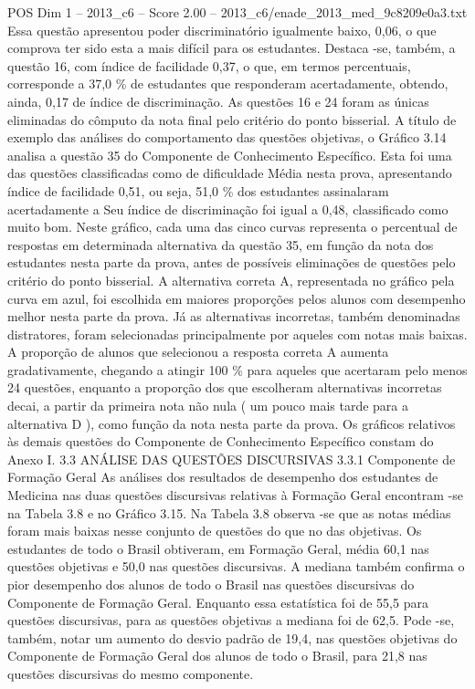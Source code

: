 \begin{textsample}{POS Dim 1 – 2013\_c6 – Score 2.00 – 2013\_c6/enade\_2013\_med\_9c8209e0a3.txt}
Essa questão apresentou poder discriminatório igualmente baixo, 0,06, o que comprova ter sido esta a mais difícil para os estudantes.
Destaca -se, também, a questão 16, com índice de facilidade 0,37, o que, em termos percentuais, corresponde a 37,0 \% de estudantes que responderam acertadamente, obtendo, ainda, 0,17 de índice de discriminação.
As questões 16 e 24 foram as únicas eliminadas do cômputo da nota final pelo critério do ponto bisserial.
A título de exemplo das análises do comportamento das questões objetivas, o Gráfico 3.14 analisa a questão 35 do Componente de Conhecimento Específico.
Esta foi uma das questões classificadas como de dificuldade Média nesta prova, apresentando índice de facilidade 0,51, ou seja, 51,0 \% dos estudantes assinalaram acertadamente a Seu índice de discriminação foi igual a 0,48, classificado como muito bom.
Neste gráfico, cada uma das cinco curvas representa o percentual de respostas em determinada alternativa da questão 35, em função da nota dos estudantes nesta parte da prova, antes de possíveis eliminações de questões pelo critério do ponto bisserial.
A alternativa correta A, representada no gráfico pela curva em azul, foi escolhida em maiores proporções pelos alunos com desempenho melhor nesta parte da prova.
Já as alternativas incorretas, também denominadas distratores, foram selecionadas principalmente por aqueles com notas mais baixas.
A proporção de alunos que selecionou a resposta correta A aumenta gradativamente, chegando a atingir 100 \% para aqueles que acertaram pelo menos 24 questões, enquanto a proporção dos que escolheram alternativas incorretas decai, a partir da primeira nota não nula ( um pouco mais tarde para a alternativa D ), como função da nota nesta parte da prova.
Os gráficos relativos às demais questões do Componente de Conhecimento Específico constam do Anexo I. 3.3 ANÁLISE DAS QUESTÕES DISCURSIVAS 3.3.1 Componente de Formação Geral As análises dos resultados de desempenho dos estudantes de Medicina nas duas questões discursivas relativas à Formação Geral encontram -se na Tabela 3.8 e no Gráfico 3.15.
Na Tabela 3.8 observa -se que as notas médias foram mais baixas nesse conjunto de questões do que no das objetivas.
Os estudantes de todo o Brasil obtiveram, em Formação Geral, média 60,1 nas questões objetivas e 50,0 nas questões discursivas.
A mediana também confirma o pior desempenho dos alunos de todo o Brasil nas questões discursivas do Componente de Formação Geral.
Enquanto essa estatística foi de 55,5 para questões discursivas, para as questões objetivas a mediana foi de 62,5.
Pode -se, também, notar um aumento do desvio padrão de 19,4, nas questões objetivas do Componente de Formação Geral dos alunos de todo o Brasil, para 21,8 nas questões discursivas do mesmo componente.

\end{textsample}
